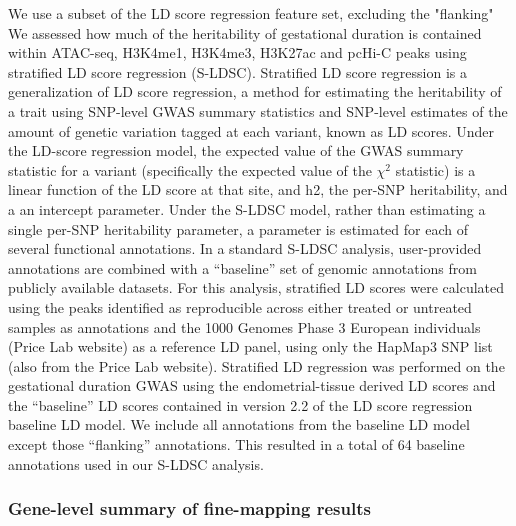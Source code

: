 We use a subset of the LD score regression feature set, excluding the "flanking"
We assessed how much of the heritability of  gestational duration is contained within ATAC-seq, H3K4me1, H3K4me3, H3K27ac and pcHi-C peaks using stratified LD score regression (S-LDSC).
Stratified LD score regression is a generalization of LD score regression, a method for estimating the heritability of a trait using SNP-level GWAS summary statistics and SNP-level estimates
 of the amount of genetic variation tagged at each variant, known as LD scores.  Under the LD-score regression model, the expected value of the GWAS summary statistic for a variant (specifically 
the expected value of the \(\chi^2\) statistic) is a linear function of the LD score at that site, and h2, the per-SNP heritability, and a an intercept parameter.  Under the S-LDSC model, rather than estimating a 
single per-SNP heritability parameter, a parameter is estimated for each of several functional annotations.  In a standard S-LDSC analysis, user-provided annotations are combined with a “baseline” set of genomic
 annotations from publicly available datasets.  For this analysis, stratified LD scores were calculated using the peaks identified as reproducible across either treated or untreated samples as annotations and the 
1000 Genomes Phase 3 European individuals (Price Lab website) as a reference LD panel, using only the HapMap3 SNP list (also from the Price Lab website). Stratified LD regression was performed on the gestational 
duration GWAS using the endometrial-tissue derived LD scores and the “baseline” LD scores contained in version 2.2 of the LD score regression baseline LD model. We include all annotations from the baseline LD model 
except those “flanking” annotations. This resulted in a total of 64 baseline annotations used in our S-LDSC analysis.  





\subsubsection{Gene-level summary of fine-mapping results}\label{sec:org3f48450}

